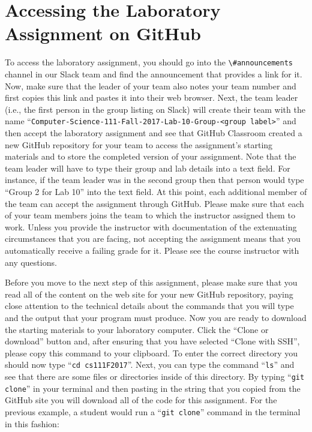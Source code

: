 \documentclass[11pt]{article}
\newcommand{\command}[1]{``\lstinline{#1}''}
\newcommand{\channel}[1]{\lstinline{#1}}
\begin{document}
\section*{Accessing the Laboratory Assignment on GitHub}

To access the laboratory assignment, you should go into the \channel{\#announcements} channel in our Slack team and find
the announcement that provides a link for it. Now, make sure that the leader of your team also notes your team number
and first copies this link and pastes it into their web browser. Next, the team leader (i.e., the first person in the
group listing on Slack) will create their team with the name \command{Computer-Science-111-Fall-2017-Lab-10-Group-<group
label>} and then accept the laboratory assignment and see that GitHub Classroom created a new GitHub repository for
your team to access the assignment's starting materials and to store the completed version of your assignment. Note that
the team leader will have to type their group and lab details into a text field. For instance, if the team leader was in
the second group then that person would type ``Group 2 for Lab 10'' into the text field. At this point, each additional
member of the team can accept the assignment through GitHub. Please make sure that each of your team members joins the
team to which the instructor assigned them to work. Unless you provide the instructor with documentation of the
extenuating circumstances that you are facing, not accepting the assignment means that you automatically receive a
failing grade for it. Please see the course instructor with any questions.

Before you move to the next step of this assignment, please make sure that you read all of the content on the web site
for your new GitHub repository, paying close attention to the technical details about the commands that you will type
and the output that your program must produce. Now you are ready to download the starting materials to your laboratory
computer. Click the ``Clone or download'' button and, after ensuring that you have selected ``Clone with SSH'', please
copy this command to your clipboard. To enter the correct directory you should now type \command{cd cs111F2017}. Next,
you can type the command \command{ls} and see that there are some files or directories inside of this directory. By
typing \command{git clone} in your terminal and then pasting in the string that you copied from the GitHub site you will
download all of the code for this assignment. For the previous example, a student would run a \command{git clone}
command in the terminal in this fashion:
\end{document}
